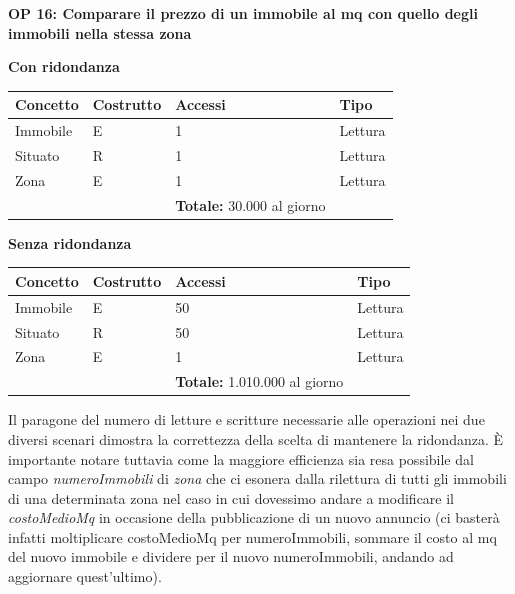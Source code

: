 \documentclass[a4paper,12pt]{report}
\begin{document}
            \textbf{OP 16: Comparare il prezzo di un immobile al mq con quello degli immobili nella stessa zona}
        	\begin{center}
                \textbf{Con ridondanza}
            \end{center}
            \begin{table}[H]
            \centering
             \begin{tabular}{llll}
             \rowcolor{yellow!20} \textbf{Concetto} & \textbf{Costrutto} & \textbf{Accessi} & \textbf{Tipo}\\ [0.5ex] 
             \hline
             Immobile & E & 1 & Lettura \\ 
             Situato & R & 1 & Lettura \\ 
             Zona & E & 1 & Lettura \\ 
             \hline
                \rowcolor{yellow!20} &   & \textbf{Totale:}  30.000 al giorno &  \\ [1ex] 
             
             \end{tabular}
            \end{table}
        	\begin{center}
                \textbf{Senza ridondanza}
            \end{center}
            \begin{table}[H]
            \centering
             \begin{tabular}{llll}
             \rowcolor{green!20} \textbf{Concetto} & \textbf{Costrutto} & \textbf{Accessi} & \textbf{Tipo}\\ [0.5ex] 
             \hline
             Immobile & E & 50 & Lettura \\ 
             Situato & R & 50 & Lettura \\ 
             Zona & E & 1 & Lettura \\ 
             \hline
                \rowcolor{green!20} &   & \textbf{Totale:}  1.010.000 al giorno &  \\ [1ex] 
             
             \end{tabular}
            \end{table}
            Il paragone del numero di letture e scritture necessarie alle operazioni nei due diversi scenari
            dimostra la correttezza della scelta di mantenere la ridondanza. È importante notare tuttavia come
            la maggiore efficienza sia resa possibile dal campo \textit{numeroImmobili} di \textit{zona} che
            ci esonera dalla rilettura di tutti gli immobili di una determinata zona nel caso in cui dovessimo 
            andare a modificare il \textit{costoMedioMq} in occasione della pubblicazione di un nuovo annuncio 
            (ci basterà infatti moltiplicare costoMedioMq per numeroImmobili, sommare il costo al mq del nuovo 
            immobile e dividere per il nuovo numeroImmobili, andando ad aggiornare quest'ultimo). \\
            \\
      
\end{document}
